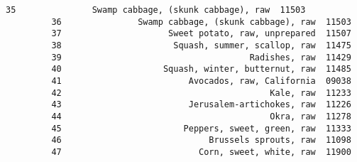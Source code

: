 \documentclass[11pt]{article}
\begin{document}
\begin{Verbatim}[commandchars=\\\{\}]
         35               Swamp cabbage, (skunk cabbage), raw  11503   
         36               Swamp cabbage, (skunk cabbage), raw  11503   
         37                     Sweet potato, raw, unprepared  11507   
         38                      Squash, summer, scallop, raw  11475   
         39                                     Radishes, raw  11429   
         40                    Squash, winter, butternut, raw  11485   
         41                         Avocados, raw, California  09038   
         42                                         Kale, raw  11233   
         43                         Jerusalem-artichokes, raw  11226   
         44                                         Okra, raw  11278   
         45                        Peppers, sweet, green, raw  11333   
         46                             Brussels sprouts, raw  11098   
         47                           Corn, sweet, white, raw  11900   
         

\end{Verbatim}
\end{document}
